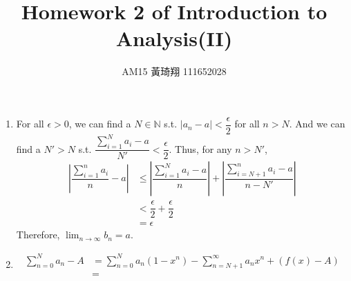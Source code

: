 \documentclass[12pt]{article}
\title{Homework 2 of Introduction to Analysis(II)}
\author{AM15 黃琦翔 111652028}
\begin{document}
\maketitle
\begin{enumerate}
    \item For all $\epsilon > 0$, we can find a $N \in \mathbb{N}$ s.t. $|a_n - a| < \dfrac{\epsilon}{2}$ for all $n > N$.
    And we can find a $N' > N$ s.t. $\dfrac{\displaystyle\sum_{i=1}^{N} a_i - a}{N'} < \dfrac{\epsilon}{2}$.
    Thus, for any $n > N'$, \begin{align*}
        |\dfrac{\sum_{i=1}^{n} a_i }{n} - a| &\leq |\dfrac{\sum_{i=1}^{N} a_i - a}{n}| + |\dfrac{\sum_{i=N+1}^{n} a_i - a}{n - N'}|\\
        &< \dfrac{\epsilon}{2} + \dfrac{\epsilon}{2}\\
        &= \epsilon
    \end{align*}
    Therefore, $\displaystyle\lim_{n\to\infty} b_n = a$.

    \item 

    \begin{align*}
        \sum_{n=0}^{N} a_n - A &= \sum_{n=0}^{N} a_n(1-x^n) - \sum_{n=N+1}^{\infty} a_n x^n + (f(x) - A)\\
        &=
    \end{align*}
    
\end{enumerate}
\end{document}
